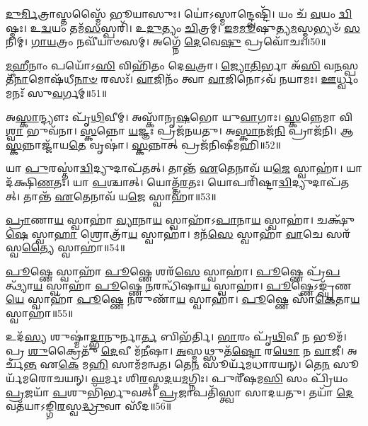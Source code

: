 \-\ul{𑌦𑍁}\-\-\ul{𑌰𑍍𑌮𑌿}\-𑌤𑍍𑌰𑌾𑌸𑍍𑌤𑌸𑍍𑌮𑍈᳴ 𑌭𑍂𑌯𑌾𑌸𑍁𑌃। 
𑌯𑍋॑𑌽𑌸𑍍𑌮𑌾𑌨𑍍𑌦𑍍𑌵𑍇𑌷𑍍𑌟𑌿᳴। 
𑌯𑌂 𑌚᳴ \ul{𑌵}\-𑌯𑌂 \ul{𑌦𑍍𑌵𑌿}\-𑌷𑍍𑌮𑌃। 
𑌉\-\ul{𑌦𑍍𑌵}\-𑌯𑌂 𑌤𑌮᳴\-\ul{𑌸}\-𑌸𑍍𑌪𑌰𑌿᳴। 
𑌉\-\ul{𑌦𑍁}\-𑌤𑍍𑌯𑌂 \ul{𑌚𑌿}\-𑌤𑍍𑌰𑌮𑍍। 
\-\ul{𑌇}\-𑌮\-\ul{𑌮𑍂}\-𑌷𑍁𑌤𑍍𑌯\-\ul{𑌮}\-𑌸𑍍𑌮𑌭𑍍𑌯𑍞᳴ \ul{𑌸}\-𑌨𑌿𑌮𑍍। 
\-\ul{𑌗𑌾}\-\-\ul{𑌯}\-𑌤𑍍𑌰𑌂 𑌨𑌵𑍀᳴𑌯𑌾𑍞𑌸𑌮𑍍। 
𑌅𑌗𑍍𑌨𑍇᳴ \ul{𑌦𑍇}\-𑌵𑍇\-\ul{𑌷𑍁} 𑌪𑍍𑌰𑌵𑍋᳴𑌚𑌃॥50॥
\anuvakamend[𑌯𑌾𑌽𑌽𑌗𑍍𑌨𑍀॑\-\ul{𑌧𑍍𑌰𑍇} 𑌤𑌾𑌨𑍍𑌤᳴ \ul{𑌏}\-𑌤𑍇𑌨𑌾𑌵᳴ 𑌯\-\ul{𑌜𑍇} 𑌸𑍍𑌵𑌾\-\ul{𑌹𑌾} 𑌧𑌰𑍍𑌮᳴𑌣𑌾 \ul{𑌶𑌂} 𑌯𑍁𑌧𑌾᳴𑌯𑌾𑌃 𑌪𑍍𑌯𑌾𑌸𑌿\-\ul{𑌷𑍀}\-𑌮\-\ul{𑌹𑌿} 𑌪𑍋𑌷𑍇᳴\-\ul{𑌣} 𑌨𑌿𑌷᳴𑌤𑍍𑌤𑍋 \ul{𑌵𑌿}\-𑌦𑍍𑌮 𑌸᳴\-\ul{𑌨𑍍𑌤𑍍𑌵}\-𑌷𑍍𑌟𑍗]

\-\ul{𑌮}\-\-\ul{𑌹𑍀}\-𑌨𑌾𑌂 𑌪𑌯𑍋᳴𑌽\-\ul{𑌸𑌿} 𑌵𑌿𑌹𑌿᳴𑌤𑌂 𑌦𑍇\-\ul{𑌵}\-𑌤𑍍𑌰𑌾। 
\-\ul{𑌜𑍍𑌯𑍋}\-\-\ul{𑌤𑌿}\-𑌰𑍍𑌭𑌾 𑌅᳴\-\ul{𑌸𑌿} 𑌵\-\ul{𑌨}\-𑌸𑍍𑌪𑌤𑍀᳴\-\ul{𑌨𑌾}\-\-𑌮𑍋𑌷᳴𑌧𑍀\-\ul{𑌨𑌾}\-\-\ul{𑍞} 𑌰𑌸𑌃᳴। 
\-\ul{𑌵𑌾}\-𑌜𑌿𑌨𑌂᳴ 𑌤𑍍𑌵𑌾 \ul{𑌵𑌾}\-𑌜𑌿𑌨𑍋𑌽𑌵᳴ 𑌨𑌯𑌾𑌮𑌃। 
\-\ul{𑌊}\-𑌰𑍍𑌧𑍍𑌵𑌂 𑌮𑌨𑌃᳴ 𑌸𑍁\-\ul{𑌵}\-𑌰𑍍𑌗𑌮𑍍॥51॥
\anuvakamend

𑌅\-\ul{𑌸𑍍𑌕𑌾}\-𑌨𑍍𑌦𑍍𑌯𑍗𑌃 𑌪𑍃᳴\-\ul{𑌥𑌿}\-𑌵𑍀𑌮𑍍। 
𑌅𑌸𑍍𑌕𑌾᳴𑌨𑍃\-\ul{𑌷}\-𑌭𑍋 𑌯𑍁\-\ul{𑌵𑌾}\-𑌗𑌾𑌃। 
\-\ul{𑌸𑍍𑌕}\-𑌨𑍍𑌨𑍇𑌮𑌾 𑌵𑌿\-\ul{𑌶𑍍𑌵𑌾} 𑌭𑍁𑌵᳴𑌨𑌾। 
\-\ul{𑌸𑍍𑌕}\-𑌨𑍍𑌨𑍋 \ul{𑌯}\-𑌜𑍍𑌞𑌃 𑌪𑍍𑌰𑌜᳴𑌨𑌯𑌤𑍁। 
𑌅\-\ul{𑌸𑍍𑌕𑌾}\-𑌨𑌜᳴\-\ul{𑌨𑌿} 𑌪𑍍𑌰𑌾𑌜᳴𑌨𑌿। 
𑌆 \ul{𑌸𑍍𑌕}\-𑌨𑍍𑌨𑌾𑌜𑍍𑌜𑌾᳴𑌯\-\ul{𑌤𑍇} 𑌵𑍃𑌷𑌾॑। 
\-\ul{𑌸𑍍𑌕}\-𑌨𑍍𑌨𑌾𑌤𑍍 𑌪𑍍𑌰𑌜᳴𑌨𑌿𑌷𑍀𑌮𑌹𑌿॥52॥
\anuvakamend

𑌯𑌾 \ul{𑌪𑍁}\-𑌰𑌸𑍍𑌤𑌾॑\-\ul{𑌦𑍍𑌵𑌿}\-𑌦𑍍𑌯𑍁𑌦𑌾𑌪᳴𑌤𑌤𑍍। 
𑌤𑌾𑌨𑍍𑌤᳴ \ul{𑌏}\-𑌤𑍇𑌨𑌾𑌵᳴ 𑌯\-\ul{𑌜𑍇} 𑌸𑍍𑌵𑌾𑌹𑌾॑। 
𑌯𑌾 𑌦᳴𑌕𑍍𑌷𑌿\-\ul{𑌣}\-𑌤𑌃। 
𑌯𑌾 \ul{𑌪}\-𑌶𑍍𑌚𑌾𑌤𑍍। 
𑌯𑍋𑌤𑍍𑌤᳴\-\ul{𑌰}\-𑌤𑌃। 
𑌯𑍋𑌪𑌰𑌿᳴𑌷𑍍𑌟𑌾\-\ul{𑌦𑍍𑌵𑌿}\-𑌦𑍍𑌯𑍁𑌦𑌾𑌪᳴𑌤𑌤𑍍। 
𑌤𑌾𑌨𑍍𑌤᳴ \ul{𑌏}\-𑌤𑍇𑌨𑌾𑌵᳴ 𑌯\-\ul{𑌜𑍇} 𑌸𑍍𑌵𑌾𑌹𑌾॑॥53॥
\anuvakamend

\-\ul{𑌪𑍍𑌰𑌾}\-𑌣𑌾\-\ul{𑌯} 𑌸𑍍𑌵𑌾𑌹𑌾॑ \ul{𑌵𑍍𑌯𑌾}\-𑌨𑌾\-\ul{𑌯} 𑌸𑍍𑌵𑌾𑌹𑌾᳴𑌽\-\ul{𑌪𑌾}\-𑌨𑌾\-\ul{𑌯} 𑌸𑍍𑌵𑌾𑌹𑌾॑। 
𑌚𑌕𑍍𑌷𑍁᳴\-\ul{𑌷𑍇} 𑌸𑍍𑌵𑌾\-\ul{𑌹𑌾} 𑌶𑍍𑌰𑍋𑌤𑍍𑌰𑌾᳴\-\ul{𑌯} 𑌸𑍍𑌵𑌾𑌹𑌾॑। 
𑌮𑌨᳴\-\ul{𑌸𑍇} 𑌸𑍍𑌵𑌾𑌹𑌾᳴ \ul{𑌵𑌾}\-𑌚𑍇 𑌸𑌰᳴𑌸𑍍𑌵\-\ul{𑌤𑍍𑌯𑍈} 𑌸𑍍𑌵𑌾𑌹𑌾॑॥54॥%
\anuvakamend

\-\ul{𑌪𑍂}\-𑌷𑍍𑌣𑍇 𑌸𑍍𑌵𑌾𑌹𑌾᳴ \ul{𑌪𑍂}\-𑌷𑍍𑌣𑍇 𑌶𑌰᳴\-\ul{𑌸𑍇} 𑌸𑍍𑌵𑌾𑌹𑌾॑। 
\-\ul{𑌪𑍂}\-𑌷𑍍𑌣𑍇 𑌪𑍍𑌰᳴\-\ul{𑌪}\-𑌤𑍍𑌥𑍍𑌯𑌾᳴\-\ul{𑌯} 𑌸𑍍𑌵𑌾𑌹𑌾᳴ \ul{𑌪𑍂}\-𑌷𑍍𑌣𑍇 \ul{𑌨}\-𑌰𑌨𑍍𑌧𑌿᳴𑌷𑌾\-\ul{𑌯} 𑌸𑍍𑌵𑌾𑌹𑌾॑। 
\-\ul{𑌪𑍂}\-𑌷𑍍𑌣𑍇𑌽𑌙𑍍𑌘𑍃᳴𑌣\-\ul{𑌯𑍇} 𑌸𑍍𑌵𑌾𑌹𑌾᳴ \ul{𑌪𑍂}\-𑌷𑍍𑌣𑍇 \ul{𑌨}\-𑌰𑍁𑌣𑌾᳴\-\ul{𑌯} 𑌸𑍍𑌵𑌾𑌹𑌾॑। 
\-\ul{𑌪𑍂}\-𑌷𑍍𑌣𑍇 𑌸𑌾᳴\-\ul{𑌕𑍇}\-𑌤𑌾\-\ul{𑌯} 𑌸𑍍𑌵𑌾𑌹𑌾॑॥55॥
\anuvakamend


𑌉𑌦᳴\-\ul{𑌸𑍍𑌯} 𑌶𑍁𑌷𑍍𑌮𑌾॑\-\ul{𑌦𑍍𑌭𑌾}\-𑌨𑍁𑌰𑍍𑌨𑌾\-\ul{𑌰𑍍𑌤} 𑌬𑌿𑌭᳴𑌰𑍍𑌤𑌿। 
\-\ul{𑌭𑌾}\-𑌰𑌂 𑌪𑍃᳴\-\ul{𑌥𑌿}\-𑌵𑍀 𑌨 𑌭𑍂𑌮᳴। 
𑌪𑍍𑌰 \ul{𑌶𑍁}\-𑌕𑍍𑌰𑍈𑌤𑍁᳴ \ul{𑌦𑍇}\-𑌵𑍀 𑌮᳴\-\ul{𑌨𑍀}\-𑌷𑌾। 
\-\ul{𑌅}\-𑌸𑍍𑌮𑌥𑍍𑌸𑍁𑌤᳴\-\ul{𑌷𑍍𑌟𑍋} 𑌰\-\ul{𑌥𑍋} 𑌨 \ul{𑌵𑌾}\-𑌜𑍀। 
𑌅𑌰𑍍𑌚᳴\-\ul{𑌨𑍍𑌤} 𑌏\-\ul{𑌕𑍇} 𑌮\-\ul{𑌹𑌿} 𑌸𑌾𑌮᳴𑌮𑌨𑍍𑌵𑌤। 
𑌤𑍇\-\ul{𑌨} 𑌸𑍂𑌰𑍍𑌯᳴𑌮𑌧𑌾𑌰𑌯𑌨𑍍। 
𑌤𑍇\-\ul{𑌨} 𑌸𑍂𑌰𑍍𑌯᳴𑌮𑌰𑍋𑌚𑌯𑌨𑍍। 
\-\ul{𑌘}\-𑌰𑍍𑌮𑌃  𑌶𑌿\-\ul{𑌰}\-𑌸𑍍𑌤\-\ul{𑌦}\-𑌯\-\ul{𑌮}\-𑌗𑍍𑌨𑌿𑌃। 
𑌪𑍁𑌰𑍀᳴𑌷𑌮\-\ul{𑌸𑌿} 𑌸𑌂 𑌪𑍍𑌰𑌿᳴𑌯𑌂 \ul{𑌪𑍍𑌰}\-𑌜𑌯𑌾᳴ \ul{𑌪}\-𑌶𑍁𑌭𑌿᳴𑌰𑍍𑌭𑍁𑌵𑌤𑍍। 
\-\ul{𑌪𑍍𑌰}\-𑌜𑌾𑌪𑌤𑌿᳴𑌸𑍍𑌤𑍍𑌵𑌾 𑌸𑌾𑌦𑌯𑌤𑍁। 
𑌤𑌯𑌾᳴ \ul{𑌦𑍇}\-𑌵𑌤᳴𑌯𑌾𑌽𑌙𑍍𑌗𑌿\-\ul{𑌰}\-𑌸𑍍𑌵\-\ul{𑌦𑍍𑌧𑍍𑌰𑍁}\-𑌵𑌾 𑌸𑍀᳴𑌦॥56॥
\anuvakamend

